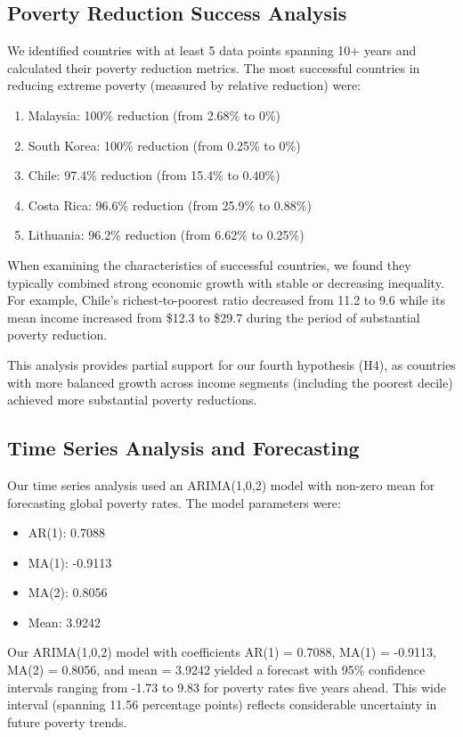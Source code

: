 \documentclass[12pt,a4paper]{article}
\begin{document}
\subsection{Poverty Reduction Success Analysis}
We identified countries with at least 5 data points spanning 10+ years and calculated their poverty reduction metrics. The most successful countries in reducing extreme poverty (measured by relative reduction) were:
\begin{enumerate}
    \item Malaysia: 100\% reduction (from 2.68\% to 0\%)
    \item South Korea: 100\% reduction (from 0.25\% to 0\%)
    \item Chile: 97.4\% reduction (from 15.4\% to 0.40\%)
    \item Costa Rica: 96.6\% reduction (from 25.9\% to 0.88\%)
    \item Lithuania: 96.2\% reduction (from 6.62\% to 0.25\%)
\end{enumerate}

When examining the characteristics of successful countries, we found they typically combined strong economic growth with stable or decreasing inequality. For example, Chile's richest-to-poorest ratio decreased from 11.2 to 9.6 while its mean income increased from \$12.3 to \$29.7 during the period of substantial poverty reduction.

This analysis provides partial support for our fourth hypothesis (H4), as countries with more balanced growth across income segments (including the poorest decile) achieved more substantial poverty reductions.

\subsection{Time Series Analysis and Forecasting}
Our time series analysis used an ARIMA(1,0,2) model with non-zero mean for forecasting global poverty rates. The model parameters were:
\begin{itemize}
    \item AR(1): 0.7088
    \item MA(1): -0.9113
    \item MA(2): 0.8056
    \item Mean: 3.9242
\end{itemize}

Our ARIMA(1,0,2) model with coefficients AR(1) = 0.7088, MA(1) = -0.9113, MA(2) = 0.8056, and mean = 3.9242 yielded a forecast with 95\% confidence intervals ranging from -1.73 to 9.83 for poverty rates five years ahead. This wide interval (spanning 11.56 percentage points) reflects considerable uncertainty in future poverty trends.
\end{document}
